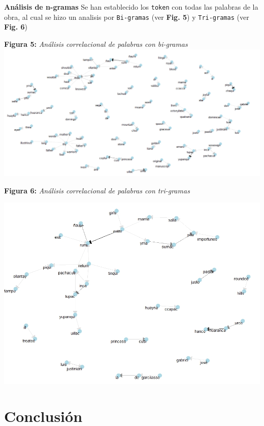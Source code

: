 \documentclass[article,30pt,extrafontsizes]{memoir}
\begin{document}
\begin{multicols*}{3}
{\textbf{Análisis de n-gramas}
Se han establecido los \texttt{\colorbox{tio}{\textcolor{titleboxbgcol}{token}}} con todas las palabras de la obra, al cual se hizo un analisis por \texttt{\colorbox{tio}{\textcolor{titleboxbgcol}{Bi-gramas}}} (ver \textbf{Fig. 5}) y \texttt{\colorbox{tio}{\textcolor{titleboxbgcol}{Tri-gramas}}} (ver \textbf{Fig. 6})

\begin{center}
	\textbf{Figura 5:} \emph{Análisis correlacional de palabras con bi-gramas}
	\includegraphics[width=9in]{piquas.png}
\end{center}

\begin{center}
	\textbf{Figura 6:} \emph{Análisis correlacional de palabras con tri-gramas}
	
	\includegraphics[width=8in]{de.jpeg}
\end{center}

\section{Conclusión}\label{conclusiuxf3n}

}
\end{multicols*}
\end{document}
